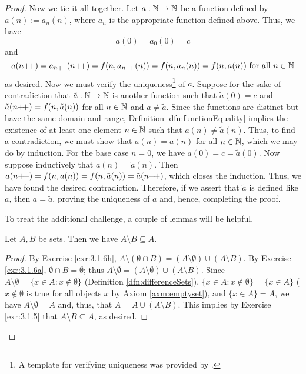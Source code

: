 \documentclass[../main.tex]{subfiles}
\begin{document}
\begin{enumerate}[ref={\thesection.\arabic*}]
\begin{proof}
        Now we tie it all together. Let $a:\mathbb{N}\to\mathbb{N}$ be a function defined by $a(n):=a_n(n)$, where $a_n$ is the appropriate function defined above. Thus, we have
        \begin{equation*}
            a(0) = a_0(0)
            = c
        \end{equation*}
        and
        \begin{equation*}
            a(n{+\!+}) = a_{n{+\!+}}(n{+\!+})
            = f(n,a_{n{+\!+}}(n))
            = f(n,a_n(n))
            = f(n,a(n))\text{ for all }n\in\mathbb{N}
        \end{equation*}
        as desired. Now we must verify the uniqueness\footnote{A template for verifying uniqueness was provided by \cite{bib:ExerciseSolutions}.} of $a$. Suppose for the sake of contradiction that $\tilde{a}:\mathbb{N}\to\mathbb{N}$ is another function such that $\tilde{a}(0)=c$ and $\tilde{a}(n{+\!+})=f(n,\tilde{a}(n))$ for all $n\in\mathbb{N}$ and $a\neq\tilde{a}$. Since the functions are distinct but have the same domain and range, Definition \ref{dfn:functionEquality} implies the existence of at least one element $n\in\mathbb{N}$ such that $a(n)\neq\tilde{a}(n)$. Thus, to find a contradiction, we must show that $a(n)=\tilde{a}(n)$ for all $n\in\mathbb{N}$, which we may do by induction. For the base case $n=0$, we have $a(0)=c=\tilde{a}(0)$. Now suppose inductively that $a(n)=\tilde{a}(n)$. Then $a(n{+\!+})=f(n,a(n))=f(n,\tilde{a}(n))=\tilde{a}(n{+\!+})$, which closes the induction. Thus, we have found the desired contradiction. Therefore, if we assert that $\tilde{a}$ is defined like $a$, then $a=\tilde{a}$, proving the uniqueness of $a$ and, hence, completing the proof.\par
        \medskip
        To treat the additional challenge, a couple of lemmas will be helpful.
        \begin{lem}\label{lem:differenceSetsSubsets}
            Let $A,B$ be sets. Then we have $A\setminus B\subseteq A$.
            \begin{proof}
                By Exercise \ref{exr:3.1.6h}, $A\setminus(\emptyset\cap B)=(A\setminus\emptyset)\cup(A\setminus B)$. By Exercise \ref{exr:3.1.6a}, $\emptyset\cap B=\emptyset$; thus $A\setminus\emptyset=(A\setminus\emptyset)\cup(A\setminus B)$. Since $A\setminus\emptyset=\{x\in A:x\notin\emptyset\}$ (Definition \ref{dfn:differenceSets}), $\{x\in A:x\notin\emptyset\}=\{x\in A\}$ ($x\notin\emptyset$ is true for all objects $x$ by Axiom \ref{axm:emptyset}), and $\{x\in A\}=A$, we have $A\setminus\emptyset=A$ and, thus, that $A=A\cup(A\setminus B)$. This implies by Exercise \ref{exr:3.1.5} that $A\setminus B\subseteq A$, as desired.

\end{proof}
\end{lem}
\end{proof}
\end{enumerate}
\end{document}
